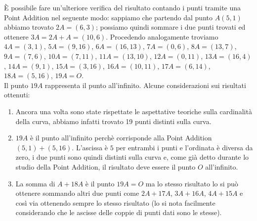 \documentclass[a4paper,12pt]{tesiinfo}
\begin{document}
\`E possibile fare un'ulteriore verifica del risultato contando i punti tramite una Point Addition nel seguente modo: sappiamo che partendo dal punto $A(5, 1)$ abbiamo trovato $2A = (6, 3)$; possiamo quindi sommare i due punti trovati ed ottenere $3A = 2A + A = (10, 6)$. Procedendo analogamente troviamo $4A = (3, 1)$, $5A = (9, 16)$, $6A = (16, 13)$, $7A = (0, 6)$, $8A = (13, 7)$, $9A = (7, 6)$, $10A = (7, 11)$, $11A = (13, 10)$, $12A = (0, 11)$, $13A = (16, 4)$,  $14A = (9, 1)$, $15A = (3, 16)$, $16A = (10, 11)$, $17A = (6, 14)$, $18A = (5, 16)$, $19A = O$.
\\
Il punto $19A$ rappresenta il punto all'infinito.
Alcune considerazioni sui risultati ottenuti:
\begin{enumerate}
    
    \item Ancora una volta sono state rispettate le aspettative teoriche sulla cardinalit\`a della curva, abbiamo infatti trovato 19 punti distinti sulla curva.
    
    \item $19A$ \`e il punto all'infinito perch\`e corrisponde alla Point Addition $(5, 1) + (5, 16)$. L'ascissa \`e $5$ per entrambi i punti e l'ordinata \`e diversa da zero, i due punti sono quindi distinti sulla curva e, come gi\`a detto durante lo studio della Point Addition, il risultato deve essere il punto $O$ all'infinito.
    
    \item La somma di $A + 18A$ \`e il punto $19A = O$ ma lo stesso risultato lo si pu\`o ottenere sommando altri due punti come $2A + 17A$, $3A + 16A$, $4A + 15A$ e cos\`i via ottenendo sempre lo stesso risultato (lo si nota facilmente considerando che le ascisse delle coppie di punti dati sono le stesse).
    

\end{enumerate}
\end{document}
